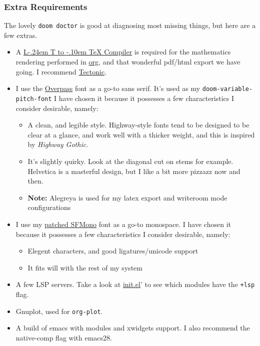 \documentclass{scrartcl}
\makeatletter
\DeclareRobustCommand{\LaTeX}{L\kern-.24em%
        {\sbox\z@ T%
         \vbox to\ht\z@{\hbox{\check@mathfonts
                              \fontsize\sf@size\z@
                              \math@fontsfalse\selectfont
                              A}%
                        \vss}%
        }%
        \kern-.10em%
        \TeX}
\makeatother
\begin{document}
\subsubsection{Extra Requirements}
\label{sec:orged13e73}
The lovely \texttt{doom doctor} is good at diagnosing most missing things, but here are a
few extras.
\begin{itemize}
\item A \href{https://www.tug.org/texlive/}{\LaTeX{} Compiler} is required for the mathematics rendering performed in \href{https://orgmode.org/}{org},
and that wonderful pdf/html export we have going. I recommend \href{https://github.com/tectonic-typesetting/tectonic}{Tectonic}.
\item I use the \href{https://overpassfont.org/}{Overpass} font as a go-to sans serif.
It's used as my \texttt{doom-variable-pitch-font}
I have chosen it because it possesses a few characteristics I consider
desirable, namely:
\begin{itemize}
\item A clean, and legible style. Highway-style fonts tend to be designed to be
clear at a glance, and work well with a thicker weight, and this is inspired
by \emph{Highway Gothic}.
\item It's slightly quirky. Look at the diagonal cut on stems for example.
Helvetica is a masterful design, but I like a bit more pizzazz now and then.
\item \textbf{Note:} Alegreya is used for my latex export and writeroom mode configurations
\end{itemize}
\item I use my \href{https://github.com/shaunsingh/SFMono-Nerd-Font-Ligaturized}{patched SFMono} font as a go-to monospace.
I have chosen it because it possesses a few characteristics I consider
desirable, namely:
\begin{itemize}
\item Elegent characters, and good ligatures/unicode support
\item It fits will with the rest of my system
\end{itemize}
\item A few LSP servers. Take a look at \href{init.el}{init.el}' to see which modules have the \texttt{+lsp}
flag.
\item Gnuplot, used for \texttt{org-plot}.
\item A build of emacs with modules and xwidgets support. I also recommend the
native-comp flag with emacs28.
\end{itemize}
\end{document}
